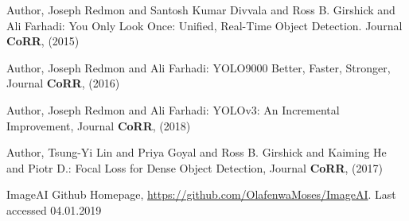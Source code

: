\documentclass[runningheads]{llncs}
\begin{document}
\begin{thebibliography}{8}
Author, Joseph Redmon and Santosh Kumar Divvala and Ross B. Girshick and Ali Farhadi: You Only Look Once: Unified, Real-Time Object Detection. Journal \textbf{CoRR}, (2015)

Author, Joseph Redmon and Ali Farhadi: YOLO9000 Better, Faster, Stronger, Journal \textbf{CoRR}, (2016)

Author, Joseph Redmon and Ali Farhadi: YOLOv3: An Incremental Improvement, Journal \textbf{CoRR}, (2018)

Author, Tsung-Yi Lin and Priya Goyal and Ross B. Girshick and Kaiming He and Piotr D.: Focal Loss for Dense Object Detection, Journal \textbf{CoRR}, (2017)

ImageAI Github Homepage, \url{https://github.com/OlafenwaMoses/ImageAI}. Last accessed 04.01.2019






\end{thebibliography}
\end{document}
